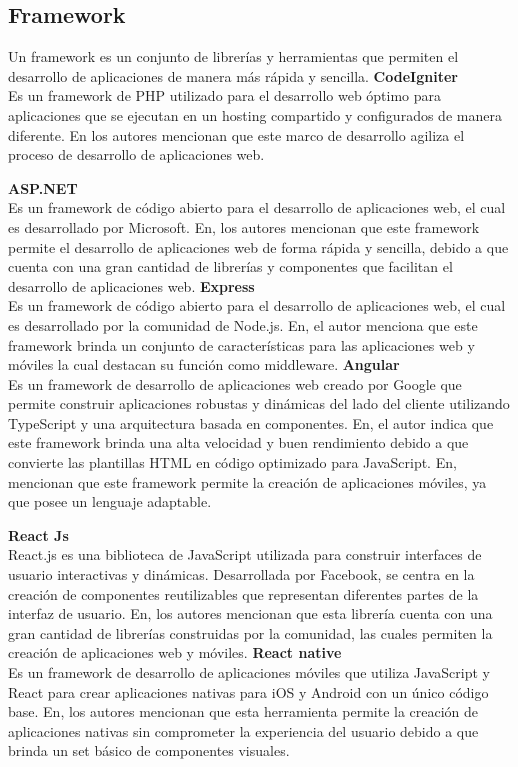 \subsection{Framework}\label{subsec:framework}
Un framework es un conjunto de librerías y herramientas que permiten el desarrollo de aplicaciones de manera más rápida y sencilla.
\bigbreak
\textbf{CodeIgniter} \\
Es un framework de PHP utilizado para el desarrollo web óptimo para aplicaciones que se ejecutan en un hosting compartido y configurados de manera diferente. En\cite{izaDesarrolloERPPara2023} los autores mencionan que este marco de desarrollo agiliza el proceso de desarrollo de aplicaciones web.
\bigbreak

\textbf{ASP.NET} \\
Es un framework de código abierto para el desarrollo de aplicaciones web, el cual es desarrollado por Microsoft. En\cite{ortegaAnalisisDisenoImplementacion2017, moreiraDESARROLLOSISTEMAWEB2019}, los autores mencionan que este framework permite el desarrollo de aplicaciones web de forma rápida y sencilla, debido a que cuenta con una gran cantidad de librerías y componentes que facilitan el desarrollo de aplicaciones web.
\bigbreak
\textbf{Express} \\
Es un framework de código abierto para el desarrollo de aplicaciones web, el cual es desarrollado por la comunidad de Node.js. En\cite{leonardoMejoraControlAsistencia2019}, el autor menciona que este framework brinda un conjunto de características para las aplicaciones web y móviles la cual destacan su función como middleware.
\bigbreak
\textbf{Angular} \\
Es un framework de desarrollo de aplicaciones web creado por Google que permite construir aplicaciones robustas y dinámicas del lado del cliente utilizando TypeScript y una arquitectura basada en componentes.
En\cite{leonardoMejoraControlAsistencia2019}, el autor indica que este framework brinda una alta velocidad y buen rendimiento debido a que convierte las plantillas HTML en código optimizado para JavaScript. En\cite{izaDesarrolloERPPara2023}, mencionan que este framework permite la creación de aplicaciones móviles, ya que posee un lenguaje adaptable.
\bigbreak

\textbf{React Js} \\
React.js es una biblioteca de JavaScript utilizada para construir interfaces de usuario interactivas y dinámicas.
Desarrollada por Facebook, se centra en la creación de componentes reutilizables que representan diferentes partes de la interfaz de usuario.
En\cite{montalvoDesarrolloSistemaSoftware2023}, los autores mencionan que esta librería cuenta con una gran cantidad de librerías construidas por la comunidad, las cuales permiten la creación de aplicaciones web y móviles.
\bigbreak
\textbf{React native} \\
Es un framework de desarrollo de aplicaciones móviles que utiliza JavaScript y React para crear aplicaciones nativas para iOS y Android con un único código base.
En\cite{montalvoDesarrolloSistemaSoftware2023}, los autores mencionan que esta herramienta permite la creación de aplicaciones nativas sin comprometer la experiencia del usuario debido a que brinda un set básico de componentes visuales.

